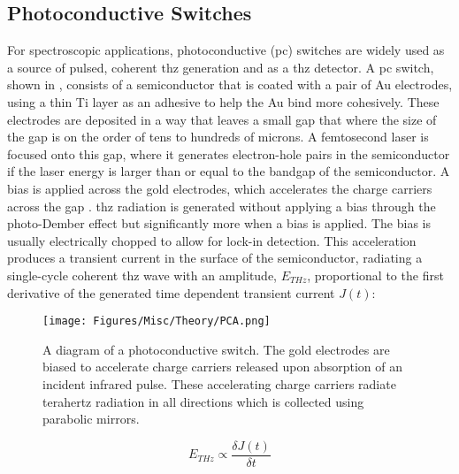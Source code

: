 \subsection{Photoconductive Switches}
\label{subsec:pcswitches}
For spectroscopic applications, photoconductive (\acrshort{pc}) switches \DIFdelbegin \DIFdel{~}\DIFdelend \cite{Warren1991} are widely used as a source of pulsed, coherent \acrshort{thz} generation and as a \acrshort{thz} detector. A \acrshort{pc} switch, shown in , consists of a semiconductor that is coated with a pair of Au electrodes, using a thin Ti layer as an adhesive to help the Au bind more cohesively. These electrodes are deposited in a way that leaves a small gap that where the size of the gap is on the order of tens to hundreds of microns. A femtosecond laser is focused onto this gap, where it generates electron\nobreakdash-hole pairs in the semiconductor if the laser energy is larger than or equal to the bandgap of the semiconductor. A bias is applied across the gold electrodes, which accelerates the charge carriers across the gap \DIFdelbegin \DIFdel{~}\DIFdelend \cite{Auston1984}. \acrshort{thz} radiation is generated without applying a bias through the photo\nobreakdash-Dember effect \DIFdelbegin \DIFdel{~}\DIFdelend \cite{Vaisakh2014} but significantly more \DIFdelbegin {}\DIFdelend \DIFaddbegin {}\DIFaddend when a bias is applied. The bias is usually electrically chopped to allow for lock\nobreakdash-in detection. This acceleration produces a transient current in the surface of the semiconductor, radiating a single\nobreakdash-cycle coherent \acrshort{thz} wave \DIFdelbegin \DIFdel{~}\DIFdelend \cite{Burford2017} with an amplitude, \(E_{THz}\), proportional to the first derivative of the generated time dependent transient current \(J(t)\):

\begin{figure}
    \centering
    \texttt{[image: Figures/Misc/Theory/PCA.png]}
    \captionsetup{font = footnotesize, justification = centering}
    \caption[A Diagram of a Photoconductive Switch]{A diagram of a photoconductive switch. The gold electrodes are biased to accelerate charge carriers released upon absorption of an incident infrared pulse. These accelerating charge carriers radiate terahertz radiation in all directions which is collected using parabolic mirrors.}
    \label{fig:PCA}
\end{figure}

\begin{equation}
E_{THz} \propto{\frac{\delta J(t)}{\delta t}}
\end{equation}

